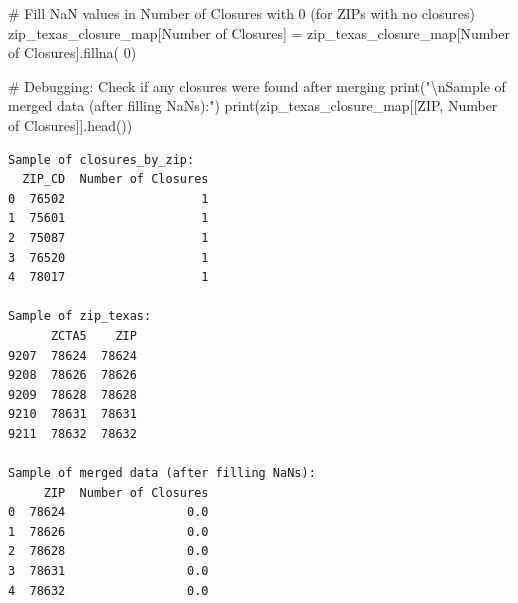 \documentclass[
  letterpaper,
  DIV=11,
  numbers=noendperiod]{scrartcl}
\newenvironment{Shaded}{\begin{snugshade}}{\end{snugshade}}
\newcommand{\BuiltInTok}[1]{\textcolor[rgb]{0.00,0.23,0.31}{#1}}
\newcommand{\CharTok}[1]{\textcolor[rgb]{0.13,0.47,0.30}{#1}}
\newcommand{\CommentTok}[1]{\textcolor[rgb]{0.37,0.37,0.37}{#1}}
\newcommand{\DecValTok}[1]{\textcolor[rgb]{0.68,0.00,0.00}{#1}}
\newcommand{\NormalTok}[1]{\textcolor[rgb]{0.00,0.23,0.31}{#1}}
\newcommand{\OperatorTok}[1]{\textcolor[rgb]{0.37,0.37,0.37}{#1}}
\newcommand{\StringTok}[1]{\textcolor[rgb]{0.13,0.47,0.30}{#1}}
\begin{document}
\begin{Shaded}
\begin{Highlighting}[]
\CommentTok{\# Fill NaN values in \textquotesingle{}Number of Closures\textquotesingle{} with 0 (for ZIPs with no closures)}
\NormalTok{zip\_texas\_closure\_map[}\StringTok{\textquotesingle{}Number of Closures\textquotesingle{}}\NormalTok{] }\OperatorTok{=}\NormalTok{ zip\_texas\_closure\_map[}\StringTok{\textquotesingle{}Number of Closures\textquotesingle{}}\NormalTok{].fillna(}
    \DecValTok{0}\NormalTok{)}

\CommentTok{\# Debugging: Check if any closures were found after merging}
\BuiltInTok{print}\NormalTok{(}\StringTok{"}\CharTok{\textbackslash{}n}\StringTok{Sample of merged data (after filling NaNs):"}\NormalTok{)}
\BuiltInTok{print}\NormalTok{(zip\_texas\_closure\_map[[}\StringTok{\textquotesingle{}ZIP\textquotesingle{}}\NormalTok{, }\StringTok{\textquotesingle{}Number of Closures\textquotesingle{}}\NormalTok{]].head())}
\end{Highlighting}
\end{Shaded}

\begin{verbatim}
Sample of closures_by_zip:
  ZIP_CD  Number of Closures
0  76502                   1
1  75601                   1
2  75087                   1
3  76520                   1
4  78017                   1

Sample of zip_texas:
      ZCTA5    ZIP
9207  78624  78624
9208  78626  78626
9209  78628  78628
9210  78631  78631
9211  78632  78632

Sample of merged data (after filling NaNs):
     ZIP  Number of Closures
0  78624                 0.0
1  78626                 0.0
2  78628                 0.0
3  78631                 0.0
4  78632                 0.0
\end{verbatim}
\end{document}
